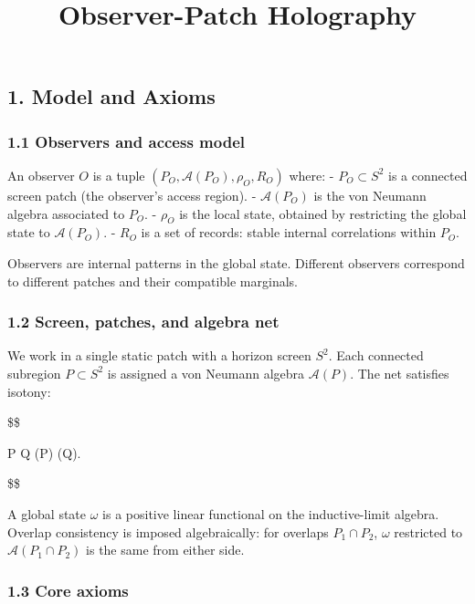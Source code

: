 \documentclass[11pt,a4paper]{article}
\title{Observer-Patch Holography}
\date{}
\theoremstyle{remark}
\begin{document}
\maketitle


\subsection{1. Model and Axioms}\label{model-and-axioms}

\subsubsection{1.1 Observers and access model}\label{observers-and-access-model}

An observer \(O\) is a tuple \((P_O, \mathcal{A}(P_O), \rho_O, R_O)\) where:
- \(P_O \subset S^2\) is a connected screen patch (the observer's access region).
- \(\mathcal{A}(P_O)\) is the von Neumann algebra associated to \(P_O\).
- \(\rho_O\) is the local state, obtained by restricting the global state to \(\mathcal{A}(P_O)\).
- \(R_O\) is a set of records: stable internal correlations within \(P_O\).

Observers are internal patterns in the global state.
Different observers correspond to different patches and their compatible
marginals.

\subsubsection{1.2 Screen, patches, and algebra net}\label{screen-patches-and-algebra-net}

We work in a single static patch with a horizon screen \(S^2\). Each connected
subregion \(P \subset S^2\) is assigned a von Neumann algebra \(\mathcal{A}(P)\). The net
satisfies isotony:

\$\$

P \subset Q \implies {}(P) \subset {}(Q).

\$\$

A global state \(\omega\) is a positive linear functional on the inductive-limit
algebra. Overlap consistency is imposed algebraically: for overlaps \(P_1 \cap P_2\),
\(\omega\) restricted to \(\mathcal{A}(P_1 \cap P_2)\) is the same from either side.

\subsubsection{1.3 Core axioms}\label{core-axioms}
\end{document}
